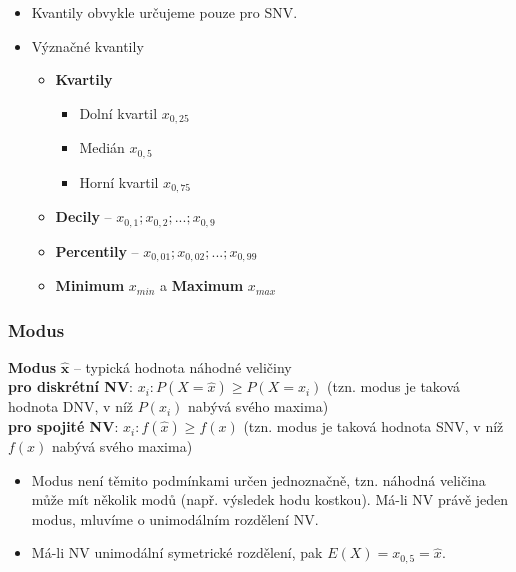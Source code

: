 \begin{itemize}
	\item Kvantily obvykle určujeme pouze pro SNV.
	\item Význačné kvantily
	\begin{itemize}
		\item \textbf{Kvartily}
		\begin{itemize}
			\item[] Dolní kvartil $x_{0,25}$
			\item[] Medián $x_{0,5}$
			\item[] Horní kvartil $x_{0,75}$
		\end{itemize}
		\item \textbf{Decily} -- $x_{0,1}; x_{0,2}; ... ;x_{0,9}$
		\item \textbf{Percentily} -- $x_{0,01}; x_{0,02}; ... ;x_{0,99}$
		\item \textbf{Minimum} $x_{min}$ a \textbf{Maximum} $x_{max}$
	\end{itemize}
\end{itemize}

\subsubsection{Modus}
\textbf{Modus} $\mathbf{\hat{x}}$ -- typická hodnota náhodné veličiny \\ 
\textbf{pro diskrétní NV}: $x_i: P(X = \hat{x}) \geq P(X = x_i)$ (tzn. modus je taková hodnota DNV, v níž $P(x_i)$ nabývá svého maxima) \\
\textbf{pro spojité NV}: $ x_i: f(\hat{x}) \geq f(x)$ (tzn. modus je taková hodnota SNV, v níž $f(x)$ nabývá svého maxima)
\begin{itemize}
	\item Modus není těmito podmínkami určen jednoznačně, tzn. náhodná veličina může mít několik modů (např. výsledek hodu kostkou). Má-li NV právě jeden modus, mluvíme o unimodálním rozdělení NV.
	\item Má-li NV unimodální symetrické rozdělení, pak $E(X) = x_{0,5} = \hat{x}$.
\end{itemize}

